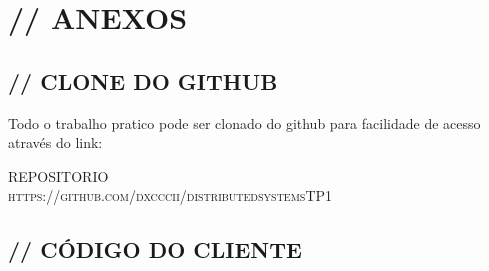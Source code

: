 \documentclass[12pt]{article}
\begin{document}
\section{// ANEXOS}
\subsection{// CLONE DO GITHUB}
Todo o trabalho pratico pode ser clonado do github para facilidade de acesso através do link:

\begin{center}
\Large{
REPOSITORIO\\
\Large{\textsc{https://github.com/dxcccii/distributedsystemsTP1}}}\\
\end{center}

\subsection{// CÓDIGO DO CLIENTE}
\end{document}
